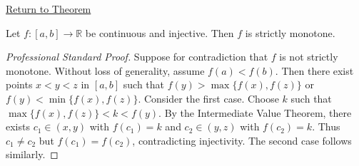 \newpage
{}
\label{prf:cont-inj-monotone}

\begin{remark*}[Return]
\hyperref[thm:cont-inj-monotone]{Return to Theorem}
\end{remark*}

\begin{theorem*}
Let $f: [a,b] \to \mathbb{R}$ be continuous and injective. Then $f$ is strictly monotone.
\end{theorem*}

\begin{proof}[Professional Standard Proof]
\LRAProofBodyStart
Suppose for contradiction that $f$ is not strictly monotone. Without loss of generality, assume $f(a) < f(b)$. Then there exist points $x < y < z$ in $[a,b]$ such that $f(y) > \max\{f(x), f(z)\}$ or $f(y) < \min\{f(x), f(z)\}$. Consider the first case. Choose $k$ such that $\max\{f(x), f(z)\} < k < f(y)$. By the Intermediate Value Theorem, there exists $c_1 \in (x, y)$ with $f(c_1) = k$ and $c_2 \in (y, z)$ with $f(c_2) = k$. Thus $c_1 \neq c_2$ but $f(c_1) = f(c_2)$, contradicting injectivity. The second case follows similarly.
\end{proof}

